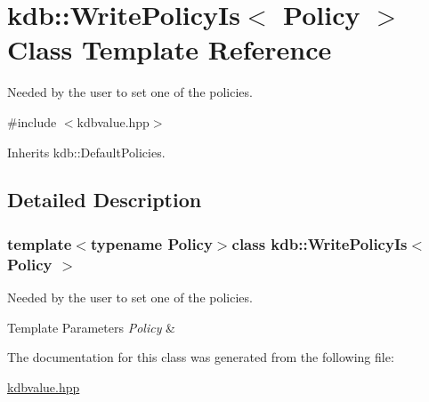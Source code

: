 \hypertarget{classkdb_1_1WritePolicyIs}{\section{kdb\+:\+:Write\+Policy\+Is$<$ Policy $>$ Class Template Reference}
\label{classkdb_1_1WritePolicyIs}
}


Needed by the user to set one of the policies.  




{\ttfamily \#include $<$kdbvalue.\+hpp$>$}



Inherits kdb\+::\+Default\+Policies.



\subsection{Detailed Description}
\subsubsection*{template$<$typename Policy$>$class kdb\+::\+Write\+Policy\+Is$<$ Policy $>$}

Needed by the user to set one of the policies. 


\begin{DoxyTemplParams}{Template Parameters}
{\em Policy} & \\
\hline
\end{DoxyTemplParams}


The documentation for this class was generated from the following file\+:\begin{DoxyCompactItemize}
\item 
\hyperlink{kdbvalue_8hpp}{kdbvalue.\+hpp}\end{DoxyCompactItemize}
